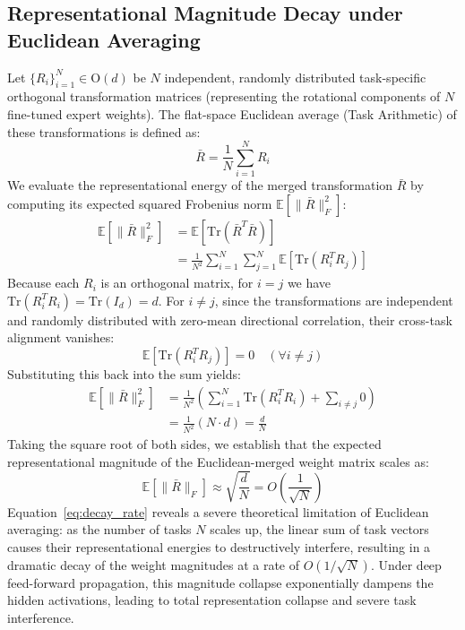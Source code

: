 \subsection{Representational Magnitude Decay under Euclidean Averaging}
Let $\{R_i\}_{i=1}^N \in \mathrm{O}(d)$ be $N$ independent, randomly distributed task-specific orthogonal transformation matrices (representing the rotational components of $N$ fine-tuned expert weights). The flat-space Euclidean average (Task Arithmetic) of these transformations is defined as:
\begin{equation}
\bar{R} = \frac{1}{N} \sum_{i=1}^N R_i
\end{equation}
We evaluate the representational energy of the merged transformation $\bar{R}$ by computing its expected squared Frobenius norm $\mathbb{E}[\|\bar{R}\|_F^2]$:
\begin{align}
\mathbb{E}[\|\bar{R}\|_F^2] &= \mathbb{E}\left[ \mathrm{Tr}\left( \bar{R}^T \bar{R} \right) \right] \\
&= \frac{1}{N^2} \sum_{i=1}^N \sum_{j=1}^N \mathbb{E}\left[ \mathrm{Tr}\left( R_i^T R_j \right) \right]
\end{align}
Because each $R_i$ is an orthogonal matrix, for $i = j$ we have $\mathrm{Tr}(R_i^T R_i) = \mathrm{Tr}(I_d) = d$. For $i \ne j$, since the transformations are independent and randomly distributed with zero-mean directional correlation, their cross-task alignment vanishes:
\begin{equation}
\mathbb{E}\left[ \mathrm{Tr}\left( R_i^T R_j \right) \right] = 0 \quad (\forall i \ne j)
\end{equation}
Substituting this back into the sum yields:
\begin{align}
\mathbb{E}[\|\bar{R}\|_F^2] &= \frac{1}{N^2} \left( \sum_{i=1}^N \mathrm{Tr}(R_i^T R_i) + \sum_{i \ne j} 0 \right) \\
&= \frac{1}{N^2} (N \cdot d) = \frac{d}{N}
\end{align}
Taking the square root of both sides, we establish that the expected representational magnitude of the Euclidean-merged weight matrix scales as:
\begin{equation}
\label{eq:decay_rate}
\mathbb{E}[\|\bar{R}\|_F] \approx \sqrt{\frac{d}{N}} = O\left( \frac{1}{\sqrt{N}} \right)
\end{equation}
Equation~\ref{eq:decay_rate} reveals a severe theoretical limitation of Euclidean averaging: as the number of tasks $N$ scales up, the linear sum of task vectors causes their representational energies to destructively interfere, resulting in a dramatic decay of the weight magnitudes at a rate of $O(1/\sqrt{N})$. Under deep feed-forward propagation, this magnitude collapse exponentially dampens the hidden activations, leading to total representation collapse and severe task interference.

